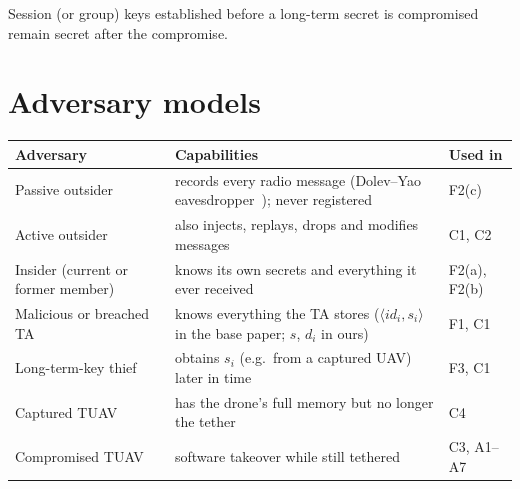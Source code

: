 \begin{definition}
Session (or group) keys established before a long-term secret is compromised remain secret after the compromise.
\end{definition}

\section{Adversary models}
\begin{center}
\small
\begin{tabularx}{\linewidth}{@{}l X l@{}}
\toprule
\textbf{Adversary} & \textbf{Capabilities} & \textbf{Used in}\\
\midrule
Passive outsider & records every radio message (Dolev--Yao eavesdropper~\cite{dolevyao}); never registered & F2(c)\\
Active outsider & also injects, replays, drops and modifies messages & C1, C2\\
Insider (current or former member) & knows its own secrets and everything it ever received & F2(a), F2(b)\\
Malicious or breached TA & knows everything the TA stores ($\langle id_i,s_i\rangle$ in the base paper; $s$, $d_i$ in ours) & F1, C1\\
Long-term-key thief & obtains $s_i$ (e.g.\ from a captured UAV) later in time & F3, C1\\
Captured TUAV & has the drone's full memory but no longer the tether & C4\\
Compromised TUAV & software takeover while still tethered & C3, A1--A7\\
\bottomrule
\end{tabularx}
\end{center}
